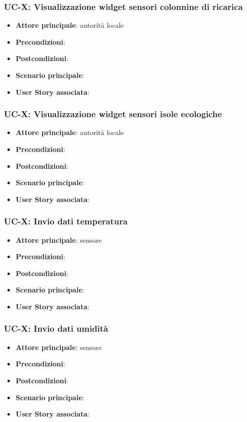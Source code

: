 \documentclass[8pt]{article}
\begin{document}
\begin{itemize}
\subsubsection{UC-X: Visualizzazione widget sensori colonnine di ricarica}
\begin{itemize}
    \item \textbf{Attore principale}: autorità locale
    \item \textbf{Precondizioni}:
    \item \textbf{Postcondizioni}:
    \item \textbf{Scenario principale}:
    \item \textbf{User Story associata}:
\end{itemize}

\subsubsection{UC-X: Visualizzazione widget sensori isole ecologiche}
\begin{itemize}
    \item \textbf{Attore principale}: autorità locale
    \item \textbf{Precondizioni}:
    \item \textbf{Postcondizioni}:
    \item \textbf{Scenario principale}:
    \item \textbf{User Story associata}:
\end{itemize}

\subsubsection{UC-X: Invio dati temperatura}
\begin{itemize}
    \item \textbf{Attore principale}: sensore
    \item \textbf{Precondizioni}:
    \item \textbf{Postcondizioni}:
    \item \textbf{Scenario principale}:
    \item \textbf{User Story associata}:
\end{itemize}

\subsubsection{UC-X: Invio dati umidità}
\begin{itemize}
    \item \textbf{Attore principale}: sensore
    \item \textbf{Precondizioni}:
    \item \textbf{Postcondizioni}:
    \item \textbf{Scenario principale}:
    \item \textbf{User Story associata}:
\end{itemize}


\end{itemize}
\end{document}
